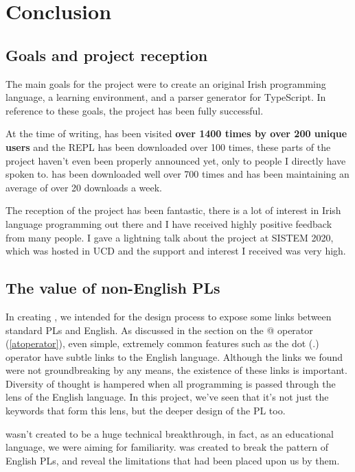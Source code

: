 \chapter{Conclusion}

\section{Goals and project reception}
The main goals for the project were to create an original Irish programming language, a learning environment, and a parser generator for TypeScript. In reference to these goals, the project has been fully successful.

At the time of writing, \trys{} has been visited \textbf{over 1400 times by over 200 unique users} and the \Setanta{} REPL has been downloaded over 100 times, these parts of the project haven't even been properly announced yet, only to people I directly have spoken to.
\tsPEG{} has been downloaded well over 700 times and has been maintaining an average of over 20 downloads a week.

The reception of the project has been fantastic, there is a lot of interest in Irish language programming out there and I have received highly positive feedback from many people. I gave a lightning talk about the project at SISTEM 2020, which was hosted in UCD and the support and interest I received was very high.

\section{The value of non-English PLs}

In creating \Setanta{}, we intended for the design process to expose some links between standard PLs and English.
As discussed in the section on the @ operator (\ref{atoperator}), even simple, extremely common features such as the dot (.) operator have subtle links to the English language.
Although the links we found were not groundbreaking by any means, the existence of these links is important. Diversity of thought is hampered when all programming is passed through the lens of the English language.
In this project, we've seen that it’s not just the keywords that form this lens, but the deeper design of the PL too.

\Setanta{} wasn't created to be a huge technical breakthrough, in fact, as an educational language, we were aiming for familiarity.
\Setanta{} was created to break the pattern of English PLs, and reveal the limitations that had been placed upon us by them.

